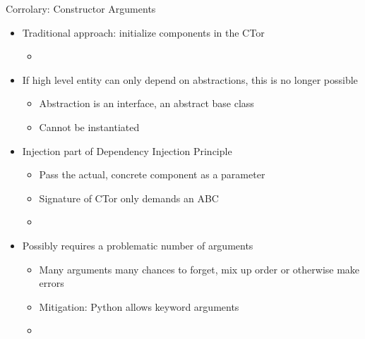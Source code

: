 
\begin{frame}{Corrolary: Constructor Arguments}
%
\begin{itemize}
\item Traditional approach: initialize components in the CTor
	\begin{itemize}
	\item {}
	\end{itemize}
\pause
\item If high level entity can only depend on abstractions, this is no longer possible
	\begin{itemize}
	\item Abstraction is an interface, \ie an abstract base class
	\item Cannot be instantiated
	\end{itemize}
\pause
\item[\Thus] Injection part of Dependency Injection Principle
	\begin{itemize}
	\item Pass the actual, concrete component as a parameter
	\item Signature of CTor only demands an ABC
	\item[\Thus] 
	\end{itemize}
\pause
\item Possibly requires a problematic number of arguments
	\begin{itemize}
	\item Many arguments \Thus many chances to forget, mix up order or otherwise make errors
	\item Mitigation: Python allows keyword arguments
	\item[\Thus] 
	\end{itemize}
\end{itemize}
%
\end{frame}


